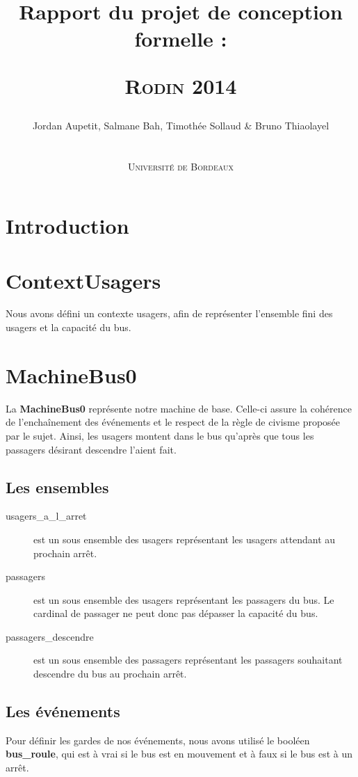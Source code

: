 \documentclass[a4paper,titlepage]{report}
\title{Rapport du projet de conception formelle :
	\begin{center}
		\textsc{Rodin 2014}
	\end{center}
}
\author{Jordan Aupetit, Salmane Bah, Timothée Sollaud \& Bruno Thiaolayel\\
	\\
	\\ \textsc{Université de Bordeaux}
}
\begin{document}
	\maketitle
	\tableofcontents
	\newpage
	\thispagestyle{empty}	
	\newpage
\markboth{}{}
\section{Introduction}
	

\section{ContextUsagers}
	Nous avons défini un contexte usagers, afin de représenter l'ensemble fini des usagers et la capacité du bus.

\section{MachineBus0}
	La \textbf{MachineBus0} représente notre machine de base. Celle-ci assure la cohérence de l'enchaînement des événements et le respect de la règle de civisme proposée par le sujet. Ainsi, les usagers montent dans le bus qu'après que tous les passagers désirant descendre l'aient fait.
	
	\subsection{Les ensembles}
		\begin{description}
			\item[usagers\_a\_l\_arret] est un sous ensemble des usagers représentant les usagers attendant au prochain arrêt.\\
			\item[passagers] est un sous ensemble des usagers représentant les passagers du bus. Le cardinal de passager ne peut donc pas dépasser la capacité du bus.\\
			\item[passagers\_descendre] est un sous ensemble des passagers représentant les passagers souhaitant descendre du bus au prochain arrêt.
		\end{description}
		
	\subsection{Les événements}
		Pour définir les gardes de nos événements, nous avons utilisé le booléen \textbf{bus\_roule}, qui est à vrai si le bus est en mouvement et à faux si le bus est à un arrêt.\\
		
\end{document}
